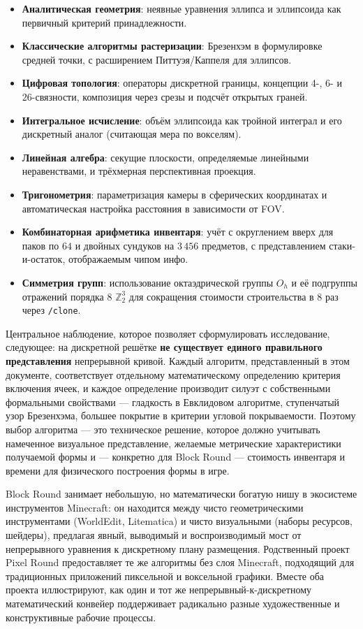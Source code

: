 \documentclass[12pt,a4paper]{scrartcl}
\newcommand{\acc}[1]{\textcolor{accent}{\textbf{#1}}}
\newcommand{\cmd}[1]{\textcolor{earth}{\texttt{\small #1}}}
\begin{document}
\begin{itemize}[leftmargin=1.3em,itemsep=0.25em,topsep=0.4em]
  \item \acc{Аналитическая геометрия}: неявные уравнения эллипса и эллипсоида как первичный критерий принадлежности.
  \item \acc{Классические алгоритмы растеризации}: Брезенхэм в формулировке средней точки, с расширением Питтуэя/Каппеля для эллипсов.
  \item \acc{Цифровая топология}: операторы дискретной границы, концепции 4-, 6- и 26-связности, композиция через срезы и подсчёт открытых граней.
  \item \acc{Интегральное исчисление}: объём эллипсоида как тройной интеграл и его дискретный аналог (считающая мера по вокселям).
  \item \acc{Линейная алгебра}: секущие плоскости, определяемые линейными неравенствами, и трёхмерная перспективная проекция.
  \item \acc{Тригонометрия}: параметризация камеры в сферических координатах и автоматическая настройка расстояния в зависимости от FOV.
  \item \acc{Комбинаторная арифметика инвентаря}: учёт с округлением вверх для паков по $64$ и двойных сундуков на $3\,456$ предметов, с представлением стаки-и-остаток, отображаемым чипом инфо.
  \item \acc{Симметрия групп}: использование октаэдрической группы $O_h$ и её подгруппы отражений порядка $8$ $\mathbb{Z}_2^3$ для сокращения стоимости строительства в $8$ раз через \cmd{/clone}.
\end{itemize}

Центральное наблюдение, которое позволяет сформулировать исследование, следующее: на дискретной решётке \acc{не существует единого правильного представления} непрерывной кривой. Каждый алгоритм, представленный в этом документе, соответствует отдельному математическому определению критерия включения ячеек, и каждое определение производит силуэт с собственными формальными свойствами — гладкость в Евклидовом алгоритме, ступенчатый узор Брезенхэма, большее покрытие в критерии угловой покрываемости. Поэтому выбор алгоритма — это техническое решение, которое должно учитывать намеченное визуальное представление, желаемые метрические характеристики получаемой формы и — конкретно для Block Round — стоимость инвентаря и времени для физического построения формы в игре.

Block Round занимает небольшую, но математически богатую нишу в экосистеме инструментов Minecraft: он находится между чисто геометрическими инструментами (WorldEdit, Litematica) и чисто визуальными (наборы ресурсов, шейдеры), предлагая явный, выводимый и воспроизводимый мост от непрерывного уравнения к дискретному плану размещения. Родственный проект Pixel Round предоставляет те же алгоритмы без слоя Minecraft, подходящий для традиционных приложений пиксельной и воксельной графики. Вместе оба проекта иллюстрируют, как один и тот же непрерывный-к-дискретному математический конвейер поддерживает радикально разные художественные и конструктивные рабочие процессы.
\end{document}
